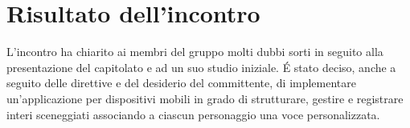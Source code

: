 \section{Risultato dell'incontro}
L'incontro ha chiarito ai membri del gruppo molti dubbi sorti in seguito alla presentazione del capitolato e ad un suo studio iniziale. \'E stato deciso, anche a seguito delle direttive e del desiderio del committente, di implementare un'applicazione per dispositivi mobili in grado di strutturare, gestire e registrare interi sceneggiati associando a ciascun personaggio una voce personalizzata.  


